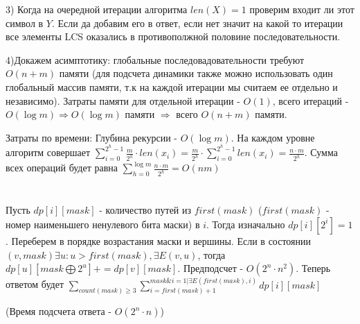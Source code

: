 \documentclass{article}
\begin{document}
\begin{flushleft}
3) Когда на очередной итерации алгоритма $len(X) = 1$ проверим входит ли этот символ в $Y$. Если да добавим его в ответ, если нет значит на какой то итерации все элементы LCS оказались в противополжной половине последовательности.

4)Докажем асимптотику: глобальные последовадовательности требуют $O(n + m)$ памяти (для подсчета динамики также можно использовать один глобальный массив памяти, т.к на каждой итерации мы считаем ее отдельно и независимо). Затраты памяти для отдельной итерации - $O(1)$, всего итераций - $O(\log{m}) \Rightarrow O(\log{m})$ памяти $\Rightarrow$ всего $O(n + m)$ памяти. 

Затраты по времени: Глубина рекурсии - $O(\log{m})$. На каждом уровне алгоритм совершает $\sum\limits_{i = 0}^{2^h - 1}{\frac{m}{2^h} \cdot len(x_i)} = \frac{m}{2 ^h} \cdot \sum\limits_{i = 0}^{2^h - 1}{len(x_i)} = \frac{n \cdot m}{2^h}$.  Сумма всех операций будет равна $\sum\limits_{h = 0}^{\log{m}}{\frac{n \cdot m}{2 ^ h}} = O(nm)$

\section{}



\section{}

Пусть $dp[i][mask]$ - количество путей из $first(mask)$ ($first(mask)$ - номер наименьшего ненулевого бита маски) в $i$. Тогда изначально $dp[i][2^i] = 1$. Переберем в порядке возрастания маски и вершины. Если в состоянии $(v, mask) \exists u: u > first(mask), \exists E(v, u)$, тогда $dp[u][mask \bigoplus 2^u] += dp[v][mask]$. Предподсчет - $O(2^n \cdot n^2)$. Теперь ответом будет $\sum\limits_{count(mask) \ge 3}{\sum\limits_{i = first(mask) + 1}^{mask \& i = 1 | \exists E(first(mask), i)}{dp[i][mask]}}$ 

(Время подсчета ответа - $O(2^n \cdot n)$)

\end{flushleft}
\end{document}
